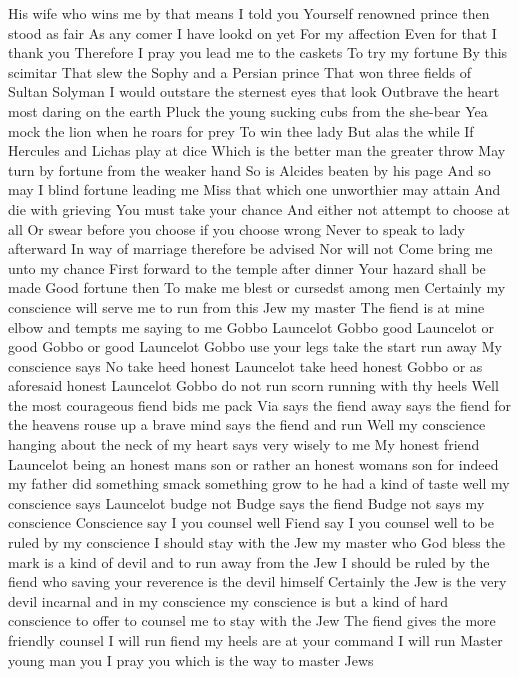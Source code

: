 His wife who wins me by that means I told you
Yourself renowned prince then stood as fair
As any comer I have lookd on yet
For my affection
Even for that I thank you
Therefore I pray you lead me to the caskets
To try my fortune By this scimitar
That slew the Sophy and a Persian prince
That won three fields of Sultan Solyman
I would outstare the sternest eyes that look
Outbrave the heart most daring on the earth
Pluck the young sucking cubs from the she-bear
Yea mock the lion when he roars for prey
To win thee lady But alas the while
If Hercules and Lichas play at dice
Which is the better man the greater throw
May turn by fortune from the weaker hand
So is Alcides beaten by his page
And so may I blind fortune leading me
Miss that which one unworthier may attain
And die with grieving
You must take your chance
And either not attempt to choose at all
Or swear before you choose if you choose wrong
Never to speak to lady afterward
In way of marriage therefore be advised
Nor will not Come bring me unto my chance
First forward to the temple after dinner
Your hazard shall be made
Good fortune then
To make me blest or cursedst among men
Certainly my conscience will serve me to run from
this Jew my master The fiend is at mine elbow and
tempts me saying to me Gobbo Launcelot Gobbo good
Launcelot or good Gobbo or good Launcelot
Gobbo use your legs take the start run away My
conscience says No take heed honest Launcelot
take heed honest Gobbo or as aforesaid honest
Launcelot Gobbo do not run scorn running with thy
heels Well the most courageous fiend bids me
pack Via says the fiend away says the
fiend for the heavens rouse up a brave mind
says the fiend and run Well my conscience
hanging about the neck of my heart says very wisely
to me My honest friend Launcelot being an honest
mans son or rather an honest womans son for
indeed my father did something smack something
grow to he had a kind of taste well my conscience
says Launcelot budge not Budge says the
fiend Budge not says my conscience
Conscience say I you counsel well Fiend
say I you counsel well to be ruled by my
conscience I should stay with the Jew my master
who God bless the mark is a kind of devil and to
run away from the Jew I should be ruled by the
fiend who saving your reverence is the devil
himself Certainly the Jew is the very devil
incarnal and in my conscience my conscience is
but a kind of hard conscience to offer to counsel
me to stay with the Jew The fiend gives the more
friendly counsel I will run fiend my heels are
at your command I will run
Master young man you I pray you which is the way
to master Jews
